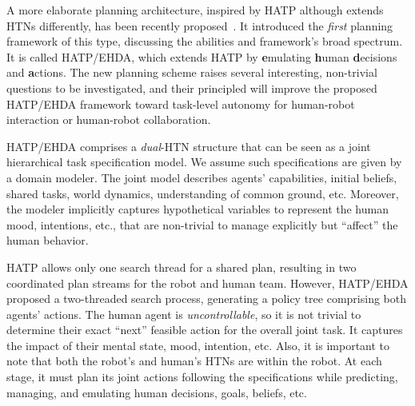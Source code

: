 \documentclass[letterpaper]{article} %
\newcommand{\note}[2][]{\added[#1,comment={#2}]{}}
\begin{document}
A more elaborate planning architecture, inspired by HATP although extends HTNs differently, has been recently proposed~\cite{BuisanA21,buisan:hal-03684211}.
It introduced the \textit{first} planning framework of this type, discussing the abilities and framework's broad spectrum.
It is called HATP/EHDA, which extends HATP by \textbf{e}mulating \textbf{h}uman \textbf{d}ecisions and \textbf{a}ctions. 
The new planning scheme raises several interesting, non-trivial questions to be investigated, and their principled will improve the proposed HATP/EHDA framework toward task-level autonomy for human-robot interaction or human-robot collaboration.

HATP/EHDA comprises a \textit{dual}-HTN structure that can be seen as a joint hierarchical task specification model. 
We assume such specifications are given by a domain modeler. The joint model describes agents' capabilities, initial beliefs, shared tasks, world dynamics, understanding of common ground, etc. Moreover, the modeler implicitly captures hypothetical variables to represent the human mood, intentions, etc., that are non-trivial to manage explicitly but ``affect'' the human behavior. 

HATP allows only one search thread for a shared plan, resulting in two coordinated plan streams for the robot and human team. 
However, HATP/EHDA proposed a two-threaded search process, generating a policy tree comprising both agents' actions. 
The human agent is \textit{uncontrollable}, so it is not trivial to determine their exact ``next'' feasible action for the overall joint task. It captures the impact of their mental state, mood, intention, etc.  
Also, it is important to note that both the robot's and human's HTNs are within the robot. At each stage, it must plan its joint actions following the specifications while predicting, managing, and emulating human decisions, goals, beliefs, etc.
\end{document}
